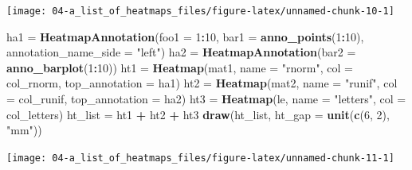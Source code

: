 \documentclass[]{book}
\newenvironment{Shaded}{\begin{snugshade}}{\end{snugshade}}
\newcommand{\KeywordTok}[1]{\textcolor[rgb]{0.13,0.29,0.53}{\textbf{#1}}}
\newcommand{\DataTypeTok}[1]{\textcolor[rgb]{0.13,0.29,0.53}{#1}}
\newcommand{\DecValTok}[1]{\textcolor[rgb]{0.00,0.00,0.81}{#1}}
\newcommand{\StringTok}[1]{\textcolor[rgb]{0.31,0.60,0.02}{#1}}
\newcommand{\OperatorTok}[1]{\textcolor[rgb]{0.81,0.36,0.00}{\textbf{#1}}}
\newcommand{\NormalTok}[1]{#1}
\theoremstyle{definition}
\theoremstyle{definition}
\theoremstyle{definition}
\theoremstyle{remark}
\begin{document}
\begin{center}\texttt{[image: 04-a\_list\_of\_heatmaps\_files/figure-latex/unnamed-chunk-10-1]} \end{center}

\begin{Shaded}
\begin{Highlighting}[]
\NormalTok{ha1 =}\StringTok{ }\KeywordTok{HeatmapAnnotation}\NormalTok{(}\DataTypeTok{foo1 =} \DecValTok{1}\OperatorTok{:}\DecValTok{10}\NormalTok{, }\DataTypeTok{bar1 =} \KeywordTok{anno_points}\NormalTok{(}\DecValTok{1}\OperatorTok{:}\DecValTok{10}\NormalTok{), }\DataTypeTok{annotation_name_side =} \StringTok{"left"}\NormalTok{)}
\NormalTok{ha2 =}\StringTok{ }\KeywordTok{HeatmapAnnotation}\NormalTok{(}\DataTypeTok{bar2 =} \KeywordTok{anno_barplot}\NormalTok{(}\DecValTok{1}\OperatorTok{:}\DecValTok{10}\NormalTok{))}
\NormalTok{ht1 =}\StringTok{ }\KeywordTok{Heatmap}\NormalTok{(mat1, }\DataTypeTok{name =} \StringTok{"rnorm"}\NormalTok{, }\DataTypeTok{col =}\NormalTok{ col_rnorm, }\DataTypeTok{top_annotation =}\NormalTok{ ha1)}
\NormalTok{ht2 =}\StringTok{ }\KeywordTok{Heatmap}\NormalTok{(mat2, }\DataTypeTok{name =} \StringTok{"runif"}\NormalTok{, }\DataTypeTok{col =}\NormalTok{ col_runif, }\DataTypeTok{top_annotation =}\NormalTok{ ha2)}
\NormalTok{ht3 =}\StringTok{ }\KeywordTok{Heatmap}\NormalTok{(le, }\DataTypeTok{name =} \StringTok{"letters"}\NormalTok{, }\DataTypeTok{col =}\NormalTok{ col_letters)}
\NormalTok{ht_list =}\StringTok{ }\NormalTok{ht1 }\OperatorTok{+}\StringTok{ }\NormalTok{ht2 }\OperatorTok{+}\StringTok{ }\NormalTok{ht3}
\KeywordTok{draw}\NormalTok{(ht_list, }\DataTypeTok{ht_gap =} \KeywordTok{unit}\NormalTok{(}\KeywordTok{c}\NormalTok{(}\DecValTok{6}\NormalTok{, }\DecValTok{2}\NormalTok{), }\StringTok{"mm"}\NormalTok{))}
\end{Highlighting}
\end{Shaded}

\begin{center}\texttt{[image: 04-a\_list\_of\_heatmaps\_files/figure-latex/unnamed-chunk-11-1]} \end{center}
\end{document}
